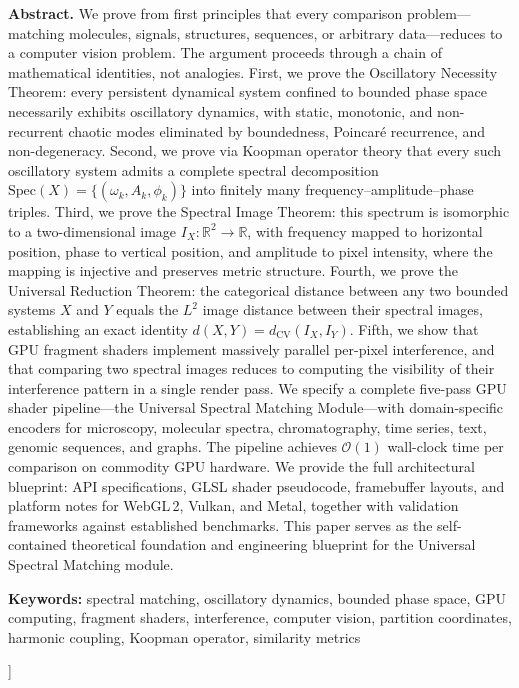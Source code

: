 \documentclass[11pt,twocolumn,a4paper]{article}
\newcommand{\BigO}{\mathcal{O}}
\newcommand{\R}{\mathbb{R}}
\newcommand{\Spec}{\mathrm{Spec}}
\begin{document}
\begin{@twocolumnfalse}
\begin{center}
\begin{minipage}{0.92\textwidth}
\textbf{Abstract.}
We prove from first principles that every comparison problem---matching
molecules, signals, structures, sequences, or arbitrary data---reduces
to a computer vision problem. The argument proceeds through a chain of
mathematical identities, not analogies. First, we prove the Oscillatory
Necessity Theorem: every persistent dynamical system confined to bounded
phase space necessarily exhibits oscillatory dynamics, with static,
monotonic, and non-recurrent chaotic modes eliminated by boundedness,
Poincar\'{e} recurrence, and non-degeneracy. Second, we prove via
Koopman operator theory that every such oscillatory system admits a
complete spectral decomposition $\Spec(X) = \{(\omega_k, A_k, \phi_k)\}$
into finitely many frequency--amplitude--phase triples. Third, we prove
the Spectral Image Theorem: this spectrum is isomorphic to a
two-dimensional image $I_X : \R^2 \to \R$, with frequency mapped to
horizontal position, phase to vertical position, and amplitude to pixel
intensity, where the mapping is injective and preserves metric structure.
Fourth, we prove the Universal Reduction Theorem: the categorical
distance between any two bounded systems $X$ and $Y$ equals the $L^2$
image distance between their spectral images, establishing an exact
identity $d(X,Y) = d_{\mathrm{CV}}(I_X, I_Y)$. Fifth, we show that GPU
fragment shaders implement massively parallel per-pixel interference,
and that comparing two spectral images reduces to computing the
visibility of their interference pattern in a single render pass.
We specify a complete five-pass GPU shader pipeline---the Universal
Spectral Matching Module---with domain-specific encoders for microscopy,
molecular spectra, chromatography, time series, text, genomic sequences,
and graphs. The pipeline achieves $\BigO(1)$ wall-clock time per
comparison on commodity GPU hardware. We provide the full architectural
blueprint: API specifications, GLSL shader pseudocode, framebuffer
layouts, and platform notes for WebGL\,2, Vulkan, and Metal, together
with validation frameworks against established benchmarks. This paper
serves as the self-contained theoretical foundation and engineering
blueprint for the Universal Spectral Matching module.

\vspace{8pt}
\noindent\textbf{Keywords:} spectral matching, oscillatory dynamics, bounded phase space,
GPU computing, fragment shaders, interference, computer vision,
partition coordinates, harmonic coupling, Koopman operator, similarity metrics
\end{minipage}

\vspace{18pt}
\end{center}
\end{@twocolumnfalse}
]
\end{document}
